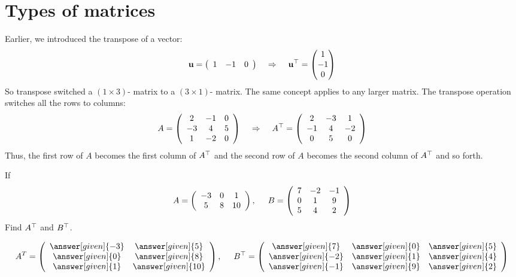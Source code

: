 \documentclass{ximera}
\begin{document}
\section{Types of matrices}
Earlier, we introduced the transpose of a vector:
\[
\mathbf{u} = \left(\begin{array}{ccc}
1 & -1 & 0
\end{array}\right)
\hspace{.4cm}\Rightarrow\hspace{.4cm}
\mathbf{u}^{\top} = \begin{pmatrix}
1\\
-1\\
0
\end{pmatrix}
\]
So transpose switched a $\left(1\times 3\right)$- matrix to a $\left(3\times 1\right)$- matrix. The same concept applies to any larger matrix. The transpose operation switches all the rows to columns:
\[
A = \left(\begin{array}{ccc}
2 & -1 & 0\\
-3 & 4 & 5\\
1 & -2 & 0
\end{array}\right)
\hspace{.4cm}\Rightarrow\hspace{.4cm}
A^{\top} = \left(\begin{array}{ccc}
2 & -3 & 1\\
-1 & 4 & -2\\
0& 5 & 0
\end{array}\right)
\]
Thus, the first row of $A$ becomes the first column of $A^{\top}$ and the second row of $A$ becomes the second column of $A^{\top}$ and so forth.
\begin{question}
If
\[A= \left(\begin{array}{ccc}
-3 & 0 & 1\\
5 & 8 & 10
\end{array}\right), \hspace{.5cm} B = \left(\begin{array}{ccc}
7 & -2 & -1 \\
0 & 1 & 9 \\
5 & 4 & 2
\end{array}\right)\]
Find $A^{\top}$ and $B^{\top}$.

\begin{prompt}
\[A^{T} = \left(\begin{array}{cc}
\answer[given]{-3} & \answer[given]{5}\\
\answer[given]{0} & \answer[given]{8}\\
\answer[given]{1} & \answer[given]{10}
\end{array}\right), \hspace{.5cm} B^{\transpose}= \left(\begin{array}{ccc}
\answer[given]{7} & \answer[given]{0} & \answer[given]{5}\\
\answer[given]{-2} & \answer[given]{1} & \answer[given]{4}\\
\answer[given]{-1} & \answer[given]{9} & \answer[given]{2}
\end{array}\right)\]
\end{prompt}
\end{question}
\end{document}
